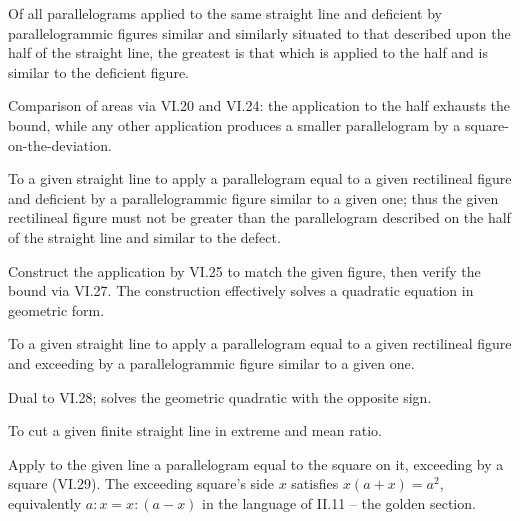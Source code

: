 \documentclass{rrxiv}
\begin{document}
\begin{claim}
\label{prop:VI.27}
Of all parallelograms applied to the same straight line and deficient
by parallelogrammic figures similar and similarly situated to that
described upon the half of the straight line, the greatest is that
which is applied to the half and is similar to the deficient figure.
\end{claim}
\begin{evidence}[Proof of VI.27]
\label{ev:VI.27}
Comparison of areas via VI.20 and VI.24: the application to the half
exhausts the bound, while any other application produces a smaller
parallelogram by a square-on-the-deviation.
\end{evidence}

\begin{claim}
\label{prop:VI.28}
To a given straight line to apply a parallelogram equal to a given
rectilineal figure and deficient by a parallelogrammic figure similar
to a given one; thus the given rectilineal figure must not be greater
than the parallelogram described on the half of the straight line and
similar to the defect.
\end{claim}
\begin{evidence}[Proof of VI.28]
\label{ev:VI.28}
Construct the application by VI.25 to match the given figure, then
verify the bound via VI.27.  The construction effectively solves a
quadratic equation in geometric form.
\end{evidence}

\begin{claim}
\label{prop:VI.29}
To a given straight line to apply a parallelogram equal to a given
rectilineal figure and exceeding by a parallelogrammic figure similar
to a given one.
\end{claim}
\begin{evidence}[Proof of VI.29]
\label{ev:VI.29}
Dual to VI.28; solves the geometric quadratic with the opposite sign.
\end{evidence}

\begin{claim}
\label{prop:VI.30}
To cut a given finite straight line in extreme and mean ratio.
\end{claim}
\begin{evidence}[Proof of VI.30]
\label{ev:VI.30}
Apply to the given line a parallelogram equal to the square on it,
exceeding by a square (VI.29).  The exceeding square's side $x$
satisfies $x(a+x) = a^2$, equivalently $a : x = x : (a - x)$ in the
language of II.11 -- the golden section.
\end{evidence}
\end{document}
